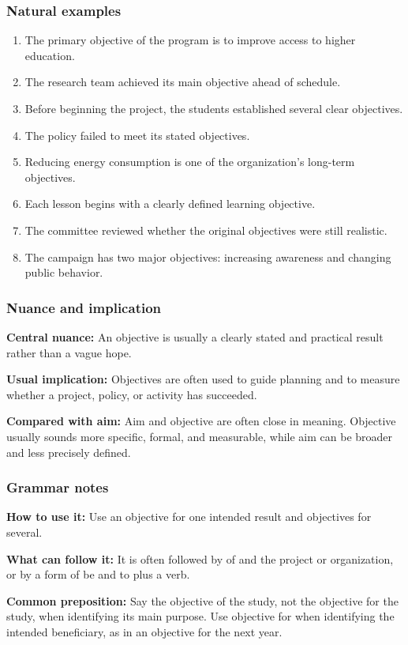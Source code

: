 \documentclass[11pt]{article}
\begin{document}
\subsubsection{Natural examples}
\begin{enumerate}
  \item The primary objective of the program is to improve access to higher education.
  \item The research team achieved its main objective ahead of schedule.
  \item Before beginning the project, the students established several clear objectives.
  \item The policy failed to meet its stated objectives.
  \item Reducing energy consumption is one of the organization's long-term objectives.
  \item Each lesson begins with a clearly defined learning objective.
  \item The committee reviewed whether the original objectives were still realistic.
  \item The campaign has two major objectives: increasing awareness and changing public behavior.
\end{enumerate}

\subsubsection{Nuance and implication}
\textbf{Central nuance:} An objective is usually a clearly stated and practical result rather than a vague hope.

\textbf{Usual implication:} Objectives are often used to guide planning and to measure whether a project, policy, or activity has succeeded.

\textbf{Compared with aim:} Aim and objective are often close in meaning. Objective usually sounds more specific, formal, and measurable, while aim can be broader and less precisely defined.

\subsubsection{Grammar notes}
\textbf{How to use it:} Use an objective for one intended result and objectives for several.

\textbf{What can follow it:} It is often followed by of and the project or organization, or by a form of be and to plus a verb.

\textbf{Common preposition:} Say the objective of the study, not the objective for the study, when identifying its main purpose. Use objective for when identifying the intended beneficiary, as in an objective for the next year.
\end{document}

